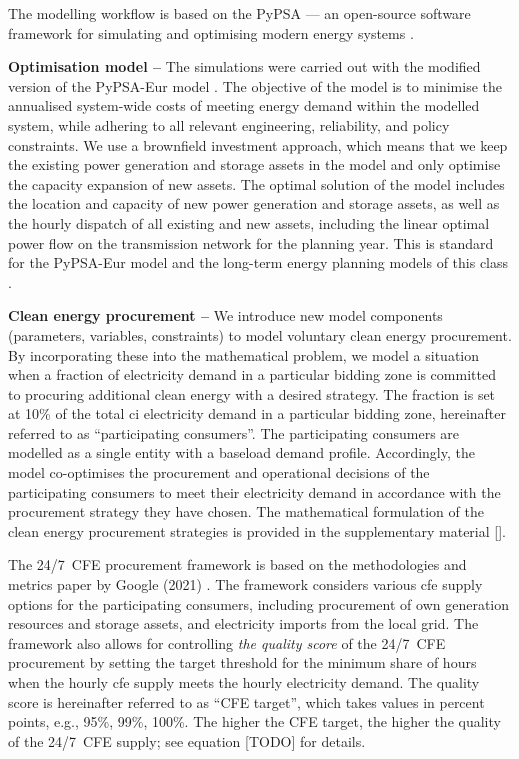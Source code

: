 The modelling workflow is based on the PyPSA --- an open-source software framework for simulating and optimising modern energy systems \cite{brownPyPSAPythonPower2018}. 

\textbf{Optimisation model --} The simulations were carried out with the modified version of the PyPSA-Eur model \cite{PyPSA-Eur-github}. 
The objective of the model is to minimise the annualised system-wide costs of meeting energy demand within the modelled system, while adhering to all relevant engineering, reliability, and policy constraints.
We use a brownfield investment approach, which means that we keep the existing power generation and storage assets in the model and only optimise the capacity expansion of new assets.
The optimal solution of the model includes the location and capacity of new power generation and storage assets, as well as the hourly dispatch of all existing and new assets, including the linear optimal power flow on the transmission network for the planning year. 
This is standard for the PyPSA-Eur model \cite{horschPyPSAEurOpenOptimisation2018} and the long-term energy planning models of this class \cite{jenkinsGenX2022, howellsOSeMOSYSOpenSource2011}.

\textbf{Clean energy procurement --} We introduce new model components (parameters, variables, constraints) to model voluntary clean energy procurement.
By incorporating these into the mathematical problem, we model a situation when a fraction of electricity demand in a particular bidding zone is committed to procuring additional clean energy with a desired strategy.
The fraction is set at 10\% of the total \gls{ci} electricity demand in a particular bidding zone, hereinafter referred to as \enquote{participating consumers}.
The participating consumers are modelled as a single entity with a baseload demand profile.
Accordingly, the model co-optimises the procurement and operational decisions of the participating consumers to meet their electricity demand in accordance with the procurement strategy they have chosen.
The mathematical formulation of the clean energy procurement strategies is provided in the supplementary material [].

The 24/7~CFE procurement framework is based on the methodologies and metrics paper by Google (2021) \cite{google-methodologies}.
The framework considers various \gls{cfe} supply options for the participating consumers, including procurement of own generation resources and storage assets, and electricity imports from the local grid.
The framework also allows for controlling \textit{the quality score} of the 24/7~CFE procurement by setting the target threshold for the minimum share of hours when the hourly \gls{cfe} supply meets the hourly electricity demand.
The quality score is hereinafter referred to as \enquote{CFE target}, which takes values in percent points, e.g., 95\%, 99\%, 100\%.
The higher the CFE target, the higher the quality of the 24/7~CFE supply; see equation [TODO] for details.


